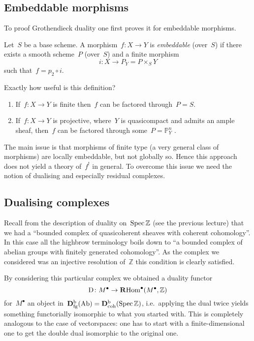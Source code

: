 \subsection{Embeddable morphisms}
\label{subsection:embeddable-morphisms}
To proof Grothendieck duality one first proves it for embeddable morphisms.
\begin{definition}
  Let~$S$ be a base scheme. A morphism~$f\colon X\to Y$ is \emph{embeddable} (over~$S$) if there exists a smooth scheme~$P$ (over~$S$) and a finite morphism
  \begin{equation}
    i\colon X\to P_Y=P\times_SY 
  \end{equation}
  such that~$f=p_2\circ i$.
\end{definition}
Exactly how useful is this definition?
\begin{enumerate}
  \item If~$f\colon X\to Y$ is finite then~$f$ can be factored through~$P=S$.
  \item If~$f\colon X\to Y$ is projective, where~$Y$ is quasicompact and admits an ample sheaf, then~$f$ can be factored through some~$P=\mathbb{P}_Y^n$ \cite[II.5.5.4(ii)]{egaII}.
\end{enumerate}
The main issue is that morphisms of finite type (a very general class of morphisms) are locally embeddable, but not globally so. Hence this approach does not yield a theory of~$f^!$ in general. To overcome this issue we need the notion of dualising and especially residual complexes.

\subsection{Dualising complexes}
\label{subsection:dualising-complexes}
Recall from the description of duality on~$\operatorname{Spec}\mathbb{Z}$ (see the previous lecture) that we had a ``bounded complex of quasicoherent sheaves with coherent cohomology''. In this case all the highbrow terminology boils down to ``a bounded complex of abelian groups with finitely generated cohomology''. As the complex we considered was an injective resolution of~$\mathbb{Z}$ this condition is clearly satisfied.

By considering this particular complex we obtained a duality functor
\begin{equation}
  \operatorname{D}\colon M^\bullet\to\operatorname{\mathbf{R}Hom}^\bullet(M^\bullet,\mathbb{Z})
\end{equation}
for~$M^\bullet$ an object in~$\mathbf{D}_{\mathrm{fg}}^{\mathrm{b}}(\mathrm{Ab})=\mathbf{D}_{\mathrm{coh}}^{\mathrm{b}}(\operatorname{Spec}\mathbb{Z})$, i.e.\ applying the dual twice yields something functorially isomorphic to what you started with. This is completely analogous to the case of vectorspaces: one has to start with a finite-dimensional one to get the double dual isomorphic to the original one.

